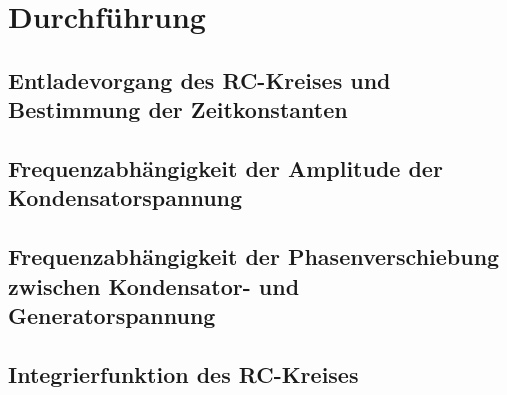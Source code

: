 \section{Durchführung}
\label{sec:Durchführung}
\subsection{Entladevorgang des RC-Kreises und Bestimmung der Zeitkonstanten}
\subsection{Frequenzabhängigkeit der Amplitude der Kondensatorspannung}
\subsection{Frequenzabhängigkeit der Phasenverschiebung zwischen Kondensator- und Generatorspannung}
\subsection{Integrierfunktion des RC-Kreises}